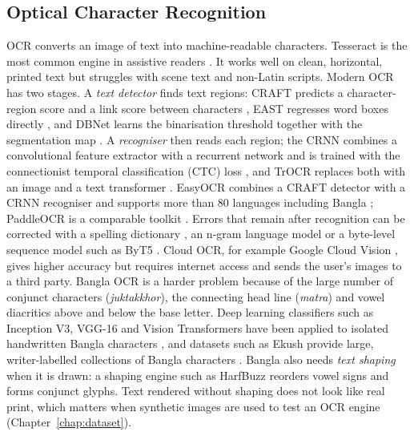 \subsection{Optical Character Recognition}
OCR converts an image of text into machine-readable characters. Tesseract \cite{tesseract} is the most common engine in assistive readers \cite{readingaid_rpi2023, cameraocr2023, itra2022, textreview2022}. It works well on clean, horizontal, printed text but struggles with scene text and non-Latin scripts. Modern OCR has two stages. A \textit{text detector} finds text regions: CRAFT predicts a character-region score and a link score between characters \cite{craft}, EAST regresses word boxes directly \cite{east}, and DBNet learns the binarisation threshold together with the segmentation map \cite{dbnet}. A \textit{recogniser} then reads each region; the CRNN combines a convolutional feature extractor with a recurrent network \cite{crnn} and is trained with the connectionist temporal classification (CTC) loss \cite{ctc}, and TrOCR replaces both with an image and a text transformer \cite{trocr}. EasyOCR combines a CRAFT detector with a CRNN recogniser and supports more than 80 languages including Bangla \cite{easyocr, easyocr_reader2022}; PaddleOCR is a comparable toolkit \cite{paddleocr}. Errors that remain after recognition can be corrected with a spelling dictionary \cite{symspell}, an n-gram language model \cite{kenlm} or a byte-level sequence model such as ByT5 \cite{byt5}. Cloud OCR, for example Google Cloud Vision \cite{cloudocr2019}, gives higher accuracy but requires internet access and sends the user's images to a third party. Bangla OCR is a harder problem because of the large number of conjunct characters (\textit{juktakkhor}), the connecting head line (\textit{matra}) and vowel diacritics above and below the base letter. Deep learning classifiers such as Inception V3, VGG-16 and Vision Transformers have been applied to isolated handwritten Bangla characters \cite{banglaocr2021}, and datasets such as Ekush provide large, writer-labelled collections of Bangla characters \cite{ekush}. Bangla also needs \textit{text shaping} when it is drawn: a shaping engine such as HarfBuzz \cite{harfbuzz} reorders vowel signs and forms conjunct glyphs. Text rendered without shaping does not look like real print, which matters when synthetic images are used to test an OCR engine (Chapter~\ref{chap:dataset}).

